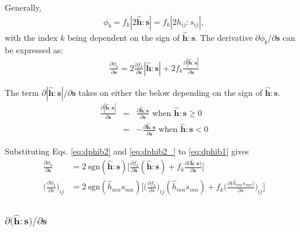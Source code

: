 \documentclass[12pt]{amsart}
\begin{document}
Generally,
\begin{eqnarray}
    \label{eq:fluc3}
\phi_b  =f_k|2\hat{\mathbf{h}}:\mathbf{s}|=f_k|2\hat{h}_{ij}:s_{ij}|,
\end{eqnarray}
with the index $k$ being dependent on the sign of $\hat{\mathbf{h}}:\mathbf{s}$.
The derivative $\partial\phi_b/\partial\mathbf{s}$ can be expressed as:
\begin{eqnarray}
    \label{eq:dphib1}
\frac{\partial{\phi_b}}{\partial{\mathbf{s}}} = 2\frac{\partial{f_k}}{\partial{\mathbf{s}}} |\hat{\mathbf{h}}:\mathbf{s}| + 2 f_k \frac{\partial{|\hat{\mathbf{h}}:\mathbf{s}|}}{\partial{\mathbf{s}}}
\end{eqnarray}

The term $\partial|\hat{\mathbf{h}}:\mathbf{s}|/\partial\mathbf{s}$ takes on either the below depending on the sign of $\hat{\mathbf{h}}:\mathbf{s}$.
\begin{eqnarray}
  \label{eq:dphib2}
  \frac{\partial{|\hat{\mathbf{h}}:\mathbf{s}|}}{\partial{\mathbf{s}}} &=&  \frac{\partial{\hat{\mathbf{h}}:\mathbf{s}}}{\partial{\mathbf{s}}}   \text{  when } \hat{\mathbf{h}}:\mathbf{s}\ge0\\
  \label{eq:dphib2_}
                                                                       &=& -\frac{\partial{\hat{\mathbf{h}}:\mathbf{s}}}{\partial{\mathbf{s}}}   \text{  when } \hat{\mathbf{h}}:\mathbf{s} < 0
\end{eqnarray}

Substituting Eqs. \ref{eq:dphib2} and \ref{eq:dphib2_} to \ref{eq:dphib1} gives
\begin{equation}
  \label{eq:dphib1_}
  \begin{split}
    \frac{\partial\phi_b}{\partial\mathbf{s}}          &= 2\ \text{sgn}(\hat{\mathbf{h}}:\mathbf{s}) \bigg[  \frac{\partial{f_k}}{\partial{\mathbf{s}}} (\hat{\mathbf{h}}:\mathbf{s}) + f_k \frac{\partial\big({\hat{\mathbf{h}}:\mathbf{s}}\big)}{\partial{\mathbf{s}}} \bigg]\\
    \bigg(\frac{\partial\phi_b}{\partial s}\bigg)_{ij} &= 2\ \text{sgn}(\hat{h}_{mn}s_{mn}) \bigg[  \bigg(\frac{\partial f_k}{\partial s}\bigg)_{ij} (\hat{h}_{mn}s_{mn}) + f_k \bigg(\frac{\partial\big({\hat{h}_{mn}s_{mn}}\big)}{\partial s}\bigg)_{ij} \bigg]\\
  \end{split}
\end{equation}


\subsubsection{$\partial\big(\hat{\mathbf{h}}:\mathbf{s}\big)/ \partial\mathbf{s}$ }
\label{sec:3.2.1}
\end{document}
